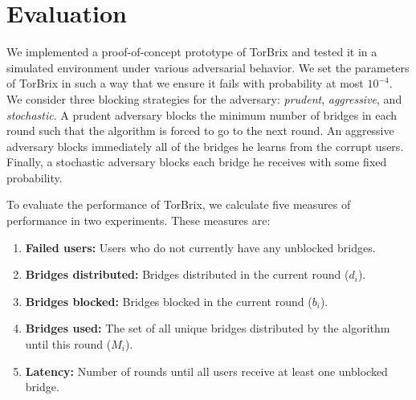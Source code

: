 \documentclass[letterpaper,twocolumn,10pt]{article}
\newcommand{\sfsize}{\fontsize{0.73\baselineskip}{0.73\baselineskip}\selectfont}
\newcommand{\sans}[1]{\textsf{\sfsize \mbox{#1}}}
\newcommand{\sansb}[1]{\textbf{\sans{\mbox{#1}}}}
\newcommand{\brix}{\sans{TorBrix}\xspace}
\begin{document}
\section{Evaluation} \label{sec:simulations}
We implemented a proof-of-concept prototype of \brix and tested it in a simulated environment under various adversarial behavior. %
We set the parameters of \brix in such a way that we ensure it fails with probability at most $10^{-4}$. 
We consider three blocking strategies for the adversary: \emph{prudent}, \emph{aggressive}, and \emph{stochastic}. A prudent adversary blocks the minimum number of bridges in each round such that the algorithm is forced to go to the next round. An aggressive adversary blocks immediately all of the bridges he learns from the corrupt users. Finally, a stochastic adversary blocks each bridge he receives with some fixed probability.

To evaluate the performance of \brix, we calculate five measures of performance in two experiments. These measures are:

\begin{enumerate}[itemsep=0.4em, topsep=0.55em]
	\item \textbf{Failed users:} Users who do not currently have any unblocked bridges. \label{measure:thirsty}
	\item \textbf{Bridges distributed:} Bridges distributed in the current round ($d_i$). \label{measure:d_i}
	\item \textbf{Bridges blocked:} Bridges blocked in the current round ($b_i$). \label{measure:b_i}
	\item \textbf{Bridges used:} The set of all unique bridges distributed by the algorithm until this round ($M_i$). \label{measure:M_i}
	\item \textbf{Latency:} Number of rounds until all users receive at least one unblocked bridge. \label{measure:latency}
\end{enumerate}
\end{document}
